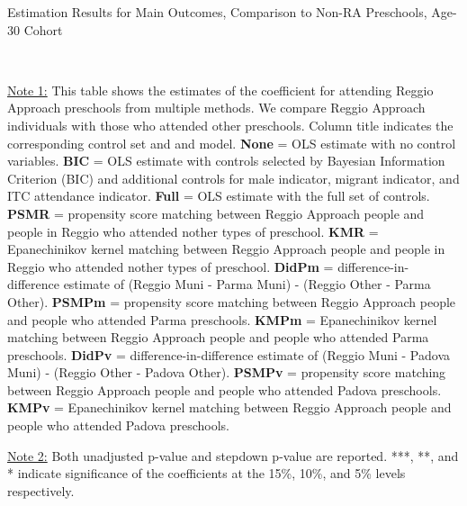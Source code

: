 

\begin{table}[H] \caption{Estimation Results for Main Outcomes, Comparison to Non-RA Preschools, Age-30 Cohort} \label{ols-M-adult30-reg-pres}
\scalebox{0.6}{}
\vspace{1ex} \\
\footnotesize\raggedright{\underline{Note 1:} This table shows the estimates of the coefficient for attending Reggio Approach preschools from multiple methods. We compare Reggio Approach individuals with those who attended other preschools. Column title indicates the corresponding control set and and model. \textbf{None} = OLS estimate with no control variables. \textbf{BIC} = OLS estimate with controls selected by Bayesian Information Criterion (BIC) and additional controls for male indicator, migrant indicator, and ITC attendance indicator. \textbf{Full} = OLS estimate with the full set of controls. \textbf{PSMR} =  propensity score matching between Reggio Approach people and people in Reggio who attended nother types of preschool. \textbf{KMR} = Epanechinikov kernel matching between Reggio Approach people and people in Reggio who attended nother types of preschool. \textbf{DidPm} = difference-in-difference estimate of (Reggio Muni - Parma Muni) - (Reggio Other - Parma Other). \textbf{PSMPm} = propensity score matching between Reggio Approach people and people who attended Parma preschools. \textbf{KMPm} = Epanechinikov kernel matching between Reggio Approach people and people who attended Parma preschools. \textbf{DidPv} = difference-in-difference estimate of (Reggio Muni - Padova Muni) - (Reggio Other - Padova Other). \textbf{PSMPv} = propensity score matching between Reggio Approach people and people who attended Padova preschools. \textbf{KMPv} = Epanechinikov kernel matching between Reggio Approach people and people who attended Padova preschools.}

\footnotesize\raggedright{\underline{Note 2:} Both unadjusted p-value and stepdown p-value are reported. ***, **, and * indicate significance of the coefficients at the 15\%, 10\%, and 5\% levels respectively.}
\end{table}

